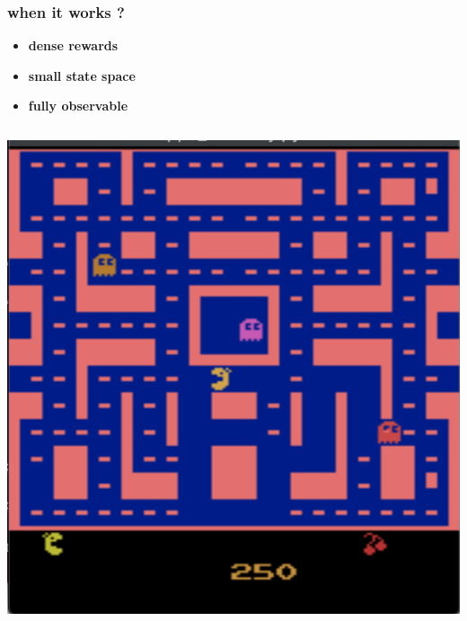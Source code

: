 \documentclass{beamer}
\begin{document}
\begin{frame}
  
  \frametitle{when it works ?} 

  \begin{itemize}
    \item {\bf dense rewards}
    \item {\bf small state space}
    \item {\bf fully observable}
  \end{itemize}

  \begin{columns}

    \begin{column}{0.5\textwidth}
      \centering
      \includegraphics[scale=0.3]{../images/pacman.png}
    \end{column}


\end{columns}
\end{frame}
\end{document}
